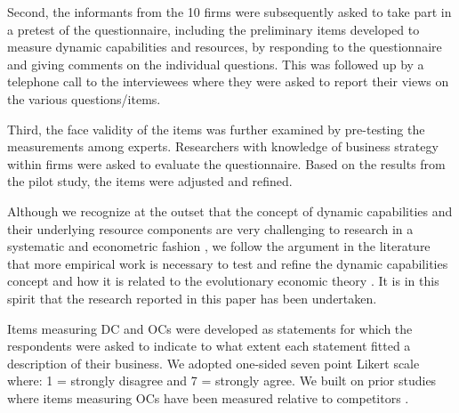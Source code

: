 \documentclass[review,fleqn]{elsarticle}\usepackage[]{graphicx}\usepackage[]{color}
\begin{document}
Second, the informants from the 10 firms were subsequently asked to take part in a pretest
of the questionnaire, including the preliminary items developed to measure dynamic
capabilities and resources, by responding to the questionnaire and giving comments on the
individual questions. This was followed up by a telephone call to the interviewees where
they were asked to report their views on the various questions/items.

Third, the face validity of the items was further examined by pre-testing the measurements
among experts. Researchers with knowledge of business strategy within firms were asked to
evaluate the questionnaire. Based on the results from the pilot study, the items were
adjusted and refined.

Although we recognize at the outset that the concept of dynamic capabilities and their
underlying resource components are very challenging to research in a systematic and
econometric fashion \citep{McKelvie2009}, we follow the argument in the
literature that more empirical work is necessary to test and refine the dynamic
capabilities concept and how it is related to the evolutionary economic theory
\citep{Arend2009,McKelvie2009} .  It
is in this spirit that the research reported in this paper has been undertaken.

Items measuring DC and OCs were developed as statements for which the respondents were
asked to indicate to what extent each statement fitted a description of their business. We
adopted one-sided seven point Likert scale where: 1 = strongly disagree and 7 = strongly
agree. We built on prior studies where items measuring OCs have been measured relative to
competitors \citep{McKelvie2009}.



  \providecommand{\huxb}[2]{\arrayrulecolor[RGB]{#1}\global\arrayrulewidth=#2pt}
  \providecommand{\huxvb}[2]{\color[RGB]{#1}\vrule width #2pt}
  \providecommand{\huxtpad}[1]{\rule{0pt}{\baselineskip+#1}}
  \providecommand{\huxbpad}[1]{\rule[-#1]{0pt}{#1}}
\end{document}

